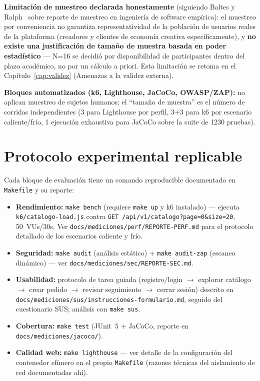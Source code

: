 \textbf{Limitación de muestreo declarada honestamente} (siguiendo Baltes
y Ralph~\cite{BALTES2022} sobre reporte de muestreo en ingeniería de
software empírica): el muestreo por conveniencia no garantiza
representatividad de la población de usuarios reales de la plataforma
(creadores y clientes de economía creativa específicamente), y
\textbf{no existe una justificación de tamaño de muestra basada en poder
estadístico} --- N=16 se decidió por disponibilidad de participantes
dentro del plazo académico, no por un cálculo a priori. Esta limitación
se retoma en el Capítulo~\ref{cap:validez} (Amenazas a la validez
externa).

\textbf{Bloques automatizados (k6, Lighthouse, JaCoCo, OWASP/ZAP):} no
aplican muestreo de sujetos humanos; el ``tamaño de muestra'' es el
número de corridas independientes (3 para Lighthouse por perfil, 3+3 para
k6 por escenario caliente/frío, 1 ejecución exhaustiva para JaCoCo sobre
la suite de 1230 pruebas).

\section{Protocolo experimental replicable}

Cada bloque de evaluación tiene un comando reproducible documentado en
\texttt{Makefile} y su reporte:

\begin{itemize}
  \item \textbf{Rendimiento:} \texttt{make bench} (requiere \texttt{make
    up} y k6 instalado) --- ejecuta \texttt{k6/catalogo-load.js} contra
    \texttt{GET /api/v1/catalogo?page=0\&size=20}, 50~VUs/30s. Ver
    \texttt{docs/mediciones/perf/REPORTE-PERF.md} para el protocolo
    detallado de los escenarios caliente y frío.
  \item \textbf{Seguridad:} \texttt{make audit} (análisis estático) +
    \texttt{make audit-zap} (escaneo dinámico) --- ver
    \texttt{docs/mediciones/sec/REPORTE-SEC.md}.
  \item \textbf{Usabilidad:} protocolo de tarea guiada
    (registro/login $\to$ explorar catálogo $\to$ crear pedido $\to$
    revisar seguimiento $\to$ cerrar sesión) descrito en
    \texttt{docs/mediciones/sus/instrucciones-formulario.md}, seguido del
    cuestionario SUS; análisis con \texttt{make sus}.
  \item \textbf{Cobertura:} \texttt{make test} (JUnit~5 + JaCoCo, reporte
    en \texttt{docs/mediciones/jacoco/}).
  \item \textbf{Calidad web:} \texttt{make lighthouse} --- ver detalle de
    la configuración del contenedor efímero en el propio \texttt{Makefile}
    (razones técnicas del aislamiento de red documentadas ahí).
\end{itemize}

